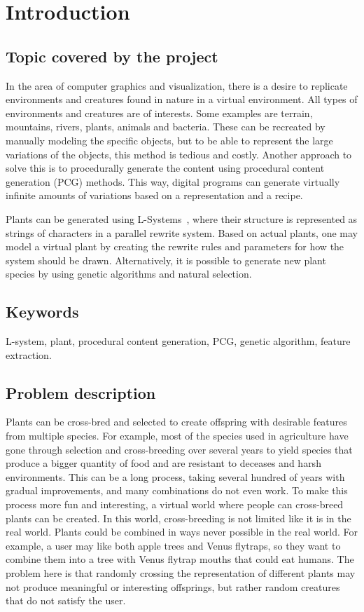 \chapter{Introduction}
\label{chap:introduction}

\section{Topic covered by the project}
In the area of computer graphics and visualization, there is a desire to replicate environments and creatures found in nature in a virtual environment.
All types of environments and creatures are of interests.
Some examples are terrain, mountains, rivers, plants, animals and bacteria.
These can be recreated by manually modeling the specific objects, but to be able to represent the large variations of the objects, this method is tedious and costly.
Another approach to solve this is to procedurally generate the content using procedural content generation (PCG) methods.
This way, digital programs can generate virtually infinite amounts of variations based on a representation and a recipe.

Plants can be generated using L-Systems~\cite{2012Prusinkiewicz}, where their structure is represented as strings of characters in a parallel rewrite system.
Based on actual plants, one may model a virtual plant by creating the rewrite rules and parameters for how the system should be drawn.
Alternatively, it is possible to generate new plant species by using genetic algorithms and natural selection.

\section{Keywords}
L-system, plant, procedural content generation, PCG, genetic algorithm, feature extraction.

\section{Problem description}
\label{sec:ProblemDescription}
Plants can be cross-bred and selected to create offspring with desirable features from multiple species.
For example, most of the species used in agriculture have gone through selection and cross-breeding over several years to yield species that produce a bigger quantity of food and are resistant to deceases and harsh environments.
This can be a long process, taking several hundred of years with gradual improvements, and many combinations do not even work.
To make this process more fun and interesting, a virtual world where people can cross-breed plants can be created.
In this world, cross-breeding is not limited like it is in the real world.
Plants could be combined in ways never possible in the real world.
For example, a user may like both apple trees and Venus flytraps, so they want to combine them into a tree with Venus flytrap mouths that could eat humans.
The problem here is that randomly crossing the representation of different plants may not produce meaningful or interesting offsprings, but rather random creatures that do not satisfy the user.

